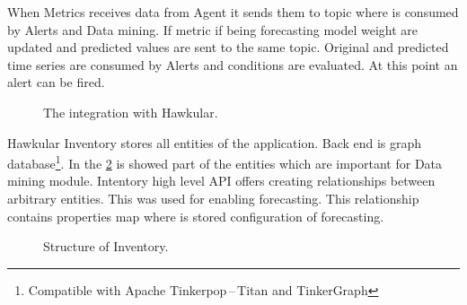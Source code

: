     When Metrics receives data from Agent it sends them to topic where is consumed by Alerts
    and Data mining. If metric if being forecasting model weight are updated and predicted
    values are sent to the same topic. Original and predicted time series are consumed by 
    Alerts and conditions are evaluated. At this point an alert can be fired. 

    \begin{figure}[H]
        \begin{center}
            \caption{The integration with Hawkular.}
            \label{img_integration}
        \end{center}
    \end{figure}

    Hawkular Inventory stores all entities of the application. Back end is graph
    database\footnote{Compatible with Apache Tinkerpop\,--\,Titan and TinkerGraph}.
    In the \ref{img_inventory} is showed part of the entities which are important for
    Data mining module.
    Intentory high level API offers creating relationships between arbitrary entities.
    This was used for enabling forecasting. This relationship contains properties map
    where is stored configuration of forecasting.

    \begin{figure}[H]
        \begin{center}
            \caption{Structure of Inventory.}
            \label{img_inventory}
        \end{center}
    \end{figure}

